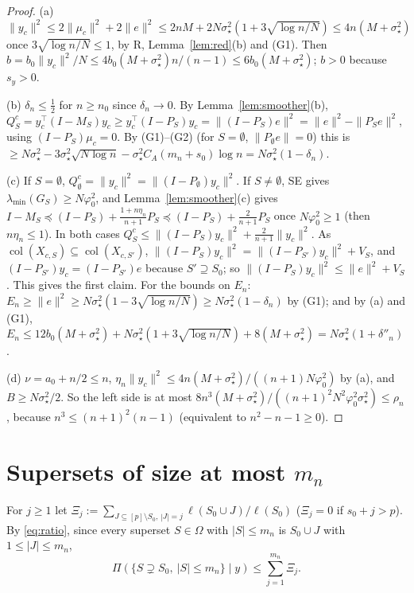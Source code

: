 \documentclass[11pt]{article}
\theoremstyle{definition}
\newcommand{\1}{\mathbf 1}
\newcommand{\sst}{\sigma_\star^2}
\newcommand{\vp}{\varphi_0^2}
\newcommand{\tr}{^{\top}}
\begin{document}
\begin{proof}
(a) $\|y_c\|^2\le2\|\mu_c\|^2+2\|e\|^2\le2nM+2N\sst(1+3\sqrt{\log n/N})\le4n(M+\sst)$ once $3\sqrt{\log n/N}\le1$, by R, Lemma~\ref{lem:red}(b) and (G1). Then $b=b_0\|y_c\|^2/N\le4b_0(M+\sst)n/(n-1)\le6b_0(M+\sst)$; $b>0$ because $s_y>0$.

(b) $\delta_n\le\frac12$ for $n\ge n_0$ since $\delta_n\to0$. By Lemma~\ref{lem:smoother}(b), $Q^c_S=y_c\tr(I-M_S)y_c\ge y_c\tr(I-P_S)y_c=\|(I-P_S)e\|^2=\|e\|^2-\|P_Se\|^2$, using $(I-P_S)\mu_c=0$. By (G1)--(G2) (for $S=\emptyset$, $\|P_\emptyset e\|=0$) this is $\ge N\sst-3\sst\sqrt{N\log n}-\sst C_A(m_n+s_0)\log n=N\sst(1-\delta_n)$.

(c) If $S=\emptyset$, $Q^c_\emptyset=\|y_c\|^2=\|(I-P_\emptyset)y_c\|^2$. If $S\ne\emptyset$, SE gives $\lambda_{\min}(G_S)\ge N\vp$, and Lemma~\ref{lem:smoother}(c) gives $I-M_S\preceq(I-P_S)+\frac{1+n\eta_n}{n+1}P_S\preceq(I-P_S)+\frac2{n+1}P_S$ once $N\vp\ge1$ (then $n\eta_n\le1$). In both cases $Q^c_S\le\|(I-P_S)y_c\|^2+\frac2{n+1}\|y_c\|^2$. As $\operatorname{col}(X_{c,S})\subseteq\operatorname{col}(X_{c,S'})$, $\|(I-P_S)y_c\|^2=\|(I-P_{S'})y_c\|^2+V_S$, and $(I-P_{S'})y_c=(I-P_{S'})e$ because $S'\supseteq S_0$; so $\|(I-P_S)y_c\|^2\le\|e\|^2+V_S$. This gives the first claim. For the bounds on $E_n$: $E_n\ge\|e\|^2\ge N\sst(1-3\sqrt{\log n/N})\ge N\sst(1-\delta_n)$ by (G1); and by (a) and (G1), $E_n\le12b_0(M+\sst)+N\sst(1+3\sqrt{\log n/N})+8(M+\sst)=N\sst(1+\delta''_n)$.

(d) $\nu=a_0+n/2\le n$, $\eta_n\|y_c\|^2\le4n(M+\sst)/((n+1)N\vp)$ by (a), and $B\ge N\sst/2$. So the left side is at most $8n^3(M+\sst)/((n+1)^2N^2\vp\sst)\le\rho_n$, because $n^3\le(n+1)^2(n-1)$ (equivalent to $n^2-n-1\ge0$).
\end{proof}

\section{Supersets of size at most \texorpdfstring{$m_n$}{m\_n}}\label{sec:sup}

For $j\ge1$ let $\Xi_j:=\sum_{J\subseteq[p]\setminus S_0,\,|J|=j}\ell(S_0\cup J)/\ell(S_0)$ ($\Xi_j=0$ if $s_0+j>p$). By \eqref{eq:ratio}, since every superset $S\in\Omega$ with $|S|\le m_n$ is $S_0\cup J$ with $1\le|J|\le m_n$,
\begin{equation}\label{eq:supsum}
\Pi(\{S\supsetneq S_0,\ |S|\le m_n\}\mid y)\le\sum_{j=1}^{m_n}\Xi_j .
\end{equation}
\end{document}
